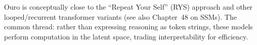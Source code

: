 \begin{notebox}
  Ouro is conceptually close to the ``Repeat Your Self'' (RYS) approach and other
  looped/recurrent transformer variants (see also Chapter~48 on SSMs). The common
  thread: rather than expressing reasoning as token strings, these models perform
  computation in the latent space, trading interpretability for efficiency.
\end{notebox}
